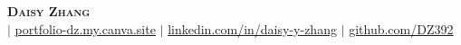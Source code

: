 \begin{center}
    \textbf{\Huge \scshape Daisy Zhang} \\ \vspace{2pt}
    \small 
    \href{mailto:\myemail}{\underline{\myemail}} $|$ 
    \href{https://portfolio-dz.my.canva.site/}{\underline{portfolio-dz.my.canva.site}} $|$ 
    \href{https://linkedin.com/in/daisy-y-zhang}{\underline{linkedin.com/in/daisy-y-zhang}} $|$
    \href{https://github.com/DZ392}{\underline{github.com/DZ392}}
\end{center}